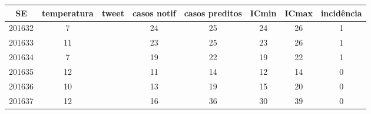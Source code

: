 \begin{tabular}{c|ccccccc}
  \hline
SE & temperatura & tweet & casos notif & casos preditos & ICmin & ICmax & incidência \\ 
  \hline
201632 & 7 &  & 24 & 25 & 24 & 26 & 1 \\ 
  201633 & 11 &  & 23 & 25 & 23 & 26 & 1 \\ 
  201634 & 7 &  & 19 & 22 & 19 & 22 & 1 \\ 
  201635 & 12 &  & 11 & 14 & 12 & 14 & 0 \\ 
  201636 & 10 &  & 13 & 19 & 15 & 20 & 0 \\ 
  201637 & 12 &  & 16 & 36 & 30 & 39 & 0 \\ 
   \hline
\end{tabular}
